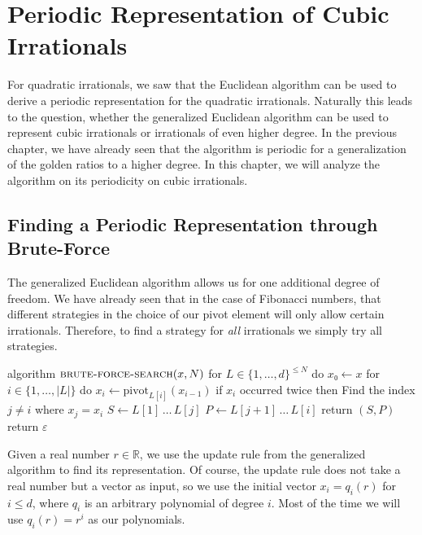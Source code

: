 \chapter{Periodic Representation of Cubic Irrationals}

For quadratic irrationals, we saw that the Euclidean algorithm can be used to
derive a periodic representation for the quadratic irrationals.
Naturally this leads to the question, whether the generalized Euclidean
algorithm can be used to represent cubic irrationals or irrationals of even
higher degree.
In the previous chapter, we have already seen that the algorithm is periodic
for a generalization of the golden ratios to a higher degree.
In this chapter, we will analyze the algorithm on its periodicity on cubic
irrationals.

\section{Finding a Periodic Representation through Brute-Force}

The generalized Euclidean algorithm allows us for one additional degree of
freedom.
We have already seen that in the case of Fibonacci numbers,
that different strategies in the choice of our pivot element will only allow
certain irrationals.
Therefore, to find a strategy for \emph{all} irrationals we simply try all strategies.

\begin{Pseudocode}[caption={The brute-force search algorithm for finding a periodic representation.}]
algorithm $\textsc{brute-force-search}(x, N)$
  for $L ∈ \{1, …, d\}^{≤ N}$ do
    $x₀ ← x$
    for $i ∈ \{1, …, |L|\}$ do
      $x_i ← \mathrm{pivot}_{L[i]}(x_{i-1})$
      if $x_i$ occurred twice then
        Find the index $j ≠ i$ where $x_j = x_i$
        $S ← L[1] \,…\, L[j]$
        $P ← L[j+1] \,…\, L[i]$
        return $(S, P)$
  return $ε$
\end{Pseudocode}

Given a real number $r ∈ ℝ$, we use the update rule from the generalized
algorithm to find its representation.
Of course, the update rule does not take a real number but a vector as input,
so we use the initial vector $x_i = q_i(r)$ for $i ≤ d$, where $q_i$ is an
arbitrary polynomial of degree $i$.
Most of the time we will use $q_i(r) = r^i$ as our polynomials.

